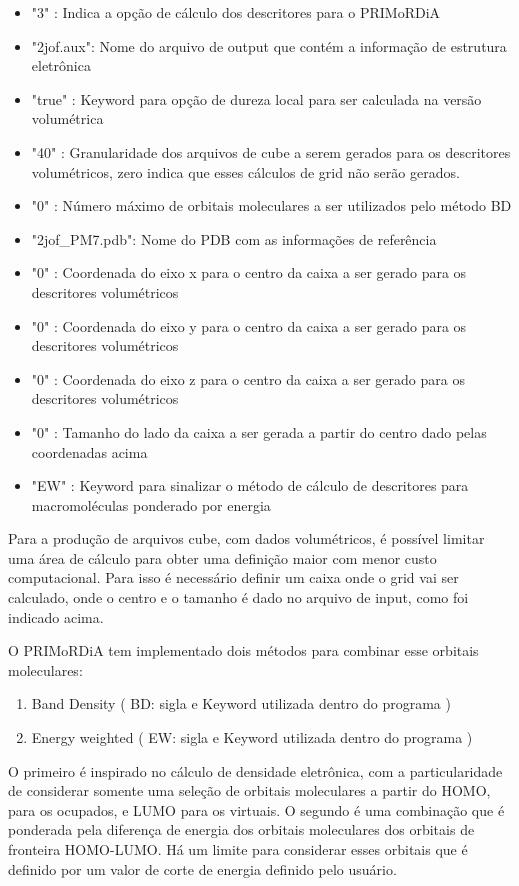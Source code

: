 \documentclass[a4paper,11pt]{refart}
\begin{document}
\begin{itemize}
	\item "3" : Indica a opção de cálculo dos descritores para o PRIMoRDiA
	\item "2jof.aux": Nome do arquivo de output que contém a informação de estrutura eletrônica
	\item "true" : Keyword para opção de dureza local para ser calculada na versão volumétrica
	\item "40" : Granularidade dos arquivos de cube a serem gerados para os descritores volumétricos, zero indica que esses cálculos de grid não serão gerados.
	\item "0" : Número máximo de orbitais moleculares a ser utilizados pelo método BD
	\item "2jof\_PM7.pdb": Nome do PDB com as informações de referência
	\item "0" : Coordenada do eixo x para o centro da caixa a ser gerado para os descritores volumétricos
	\item "0" : Coordenada do eixo y para o centro da caixa a ser gerado para os descritores volumétricos
	\item "0" : Coordenada do eixo z para o centro da caixa a ser gerado para os descritores volumétricos
	\item "0" : Tamanho do lado da caixa a ser gerada a partir do centro dado pelas coordenadas acima
	\item "EW" : Keyword para sinalizar o método de cálculo de descritores para macromoléculas ponderado por energia
\end{itemize}

Para a produção de arquivos cube, com dados volumétricos, é possível limitar uma área de cálculo para obter uma definição maior com menor custo computacional. Para isso é necessário definir um caixa onde o grid vai ser calculado, onde o centro e o tamanho é dado no arquivo de input, como foi indicado acima.

O PRIMoRDiA tem implementado dois métodos para combinar esse orbitais moleculares:

\begin{enumerate}
	\item Band Density ( BD: sigla e Keyword utilizada dentro do programa )
	\item Energy weighted ( EW: sigla e Keyword utilizada dentro do programa )
\end{enumerate}

O primeiro é inspirado no cálculo de densidade eletrônica, com a particularidade de considerar somente uma seleção de orbitais moleculares a partir do HOMO, para os ocupados, e LUMO para os virtuais. O segundo é uma combinação que é ponderada pela diferença de energia dos orbitais moleculares dos orbitais de fronteira HOMO-LUMO. Há um limite para considerar esses orbitais que é definido por um valor de corte de energia definido pelo usuário.
\end{document}
